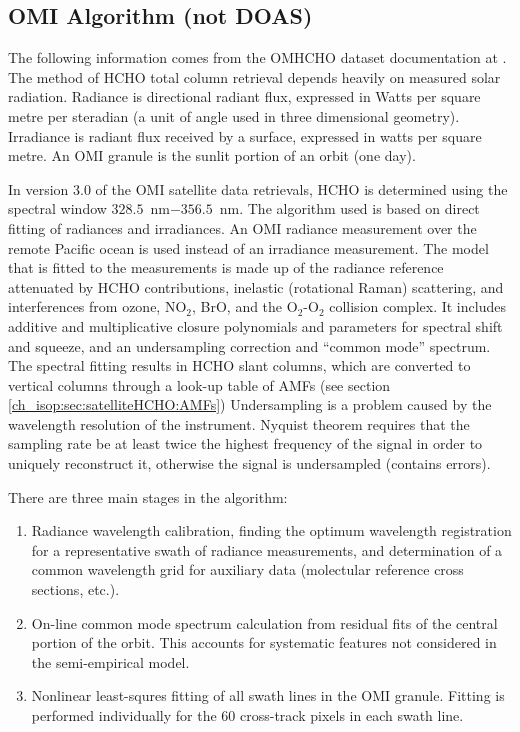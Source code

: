     
  \subsection{OMI Algorithm (not DOAS)}
    The following information comes from the OMHCHO dataset documentation at \citet{OMI_Readme}.
    The method of HCHO total column retrieval depends heavily on measured solar radiation.
    Radiance is directional radiant flux, expressed in Watts per square metre per steradian (a unit of angle used in three dimensional geometry).
    Irradiance is radiant flux received by a surface, expressed in watts per square metre.
    An OMI granule is the sunlit portion of an orbit (one day).
    
    In version 3.0 of the OMI satellite data retrievals, HCHO is determined using the spectral window $328.5$~nm$ - 356.5$~nm. 
    The algorithm used is based on direct fitting of radiances and irradiances.
    An OMI radiance measurement over the remote Pacific ocean is used instead of an irradiance measurement.
    The model that is fitted to the measurements is made up of the radiance reference attenuated by HCHO contributions, inelastic (rotational Raman) scattering, and interferences from ozone, NO$_2$, BrO, and the O$_2$-O$_2$ collision complex.
    It includes additive and multiplicative closure polynomials and parameters for spectral shift and squeeze, and an undersampling correction and ``common mode'' spectrum.
    The spectral fitting results in HCHO slant columns, which are converted to vertical columns through a look-up table of AMFs (see section \ref{ch_isop:sec:satelliteHCHO:AMFs})
    Undersampling is a problem caused by the wavelength resolution of the instrument.
    Nyquist theorem requires that the sampling rate be at least twice the highest frequency of the signal in order to uniquely reconstruct it, otherwise the signal is undersampled (contains errors).
    
    There are three main stages in the algorithm:
    \begin{enumerate}
     \item Radiance wavelength calibration, finding the optimum wavelength registration for a representative swath of radiance measurements, and determination of a common wavelength grid for auxiliary data (molectular reference cross sections, etc.).
     \item On-line common mode spectrum calculation from residual fits of the central portion of the orbit. 
     This accounts for systematic features not considered in the semi-empirical model.
     \item Nonlinear least-squres fitting of all swath lines in the OMI granule. 
     Fitting is performed individually for the 60 cross-track pixels in each swath line.
    \end{enumerate}
    
